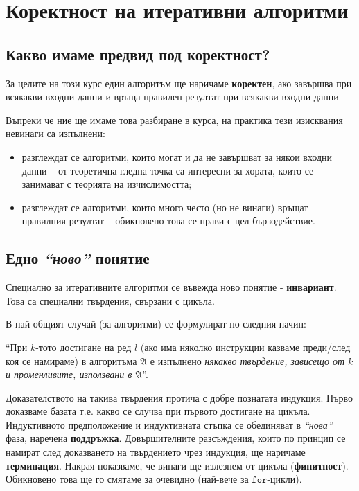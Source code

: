 \chapter{Коректност на итеративни алгоритми}

\section{Какво имаме предвид под коректност?}

За целите на този курс един алгоритъм ще наричаме \textbf{коректен}, ако завършва при всякакви входни данни и връща правилен резултат при всякакви входни данни

\begin{remark}
    Въпреки че ние ще имаме това разбиране в курса, на практика тези изисквания невинаги са изпълнени:
    \begin{itemize}
        \item разглеждат се алгоритми, които могат и да не завършват за някои входни данни -- от теоретична гледна точка са интересни за хората, които се занимават с теорията на изчислимостта;
        \item разглеждат се алгоритми, които много често (но не винаги) връщат правилния резултат -- обикновено това се прави с цел бързодействие.
    \end{itemize}
\end{remark}

\section{Едно \textit{``ново''} понятие}

Специално за итеративните алгоритми се въвежда ново понятие - \textbf{инвариант}.
Това са специални твърдения, свързани с цикъла.

В най-общият случай (за алгоритми) се формулират по следния начин:
\begin{center}
    ``При $k$-тото достигане на ред $l$ (ако има няколко инструкции казваме преди/след коя се намираме) в алгоритъма $\mathfrak{A}$ е изпълнено \textit{някакво твърдение, зависещо от $k$ и променливите, използвани в $\mathfrak{A}$}''.
\end{center}
Доказателството на такива твърдения протича с добре познатата индукция.
Първо доказваме базата т.е. какво се случва при първото достигане на цикъла.
Индуктивното предположение и индуктивната стъпка се обединяват в \textit{``нова''} фаза, наречена \textbf{поддръжка}.
Довършителните разсъждения, които по принцип се намират след доказването на твърдението чрез индукция, ще наричаме \textbf{терминация}.
Накрая показваме, че винаги ще излезнем от цикъла (\textbf{финитност}).
Обикновено това ще го смятаме за очевидно (най-вече за $\mathtt{for}$-цикли).

